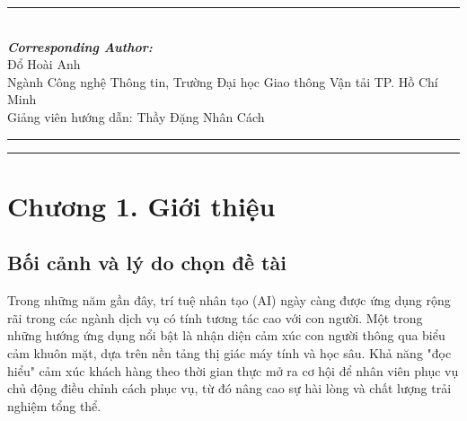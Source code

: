 \documentclass{iaesarticle}
\begin{document}
\parbox[t][][s]{0.65\textwidth}{%
\begin{abstract}
\vspace{.3em}
Trong bối cảnh chuyển đổi số, việc nắm bắt cảm xúc khách hàng theo thời gian thực đóng vai trò quan trọng trong việc nâng cao chất lượng dịch vụ tại các điểm tiếp xúc như quầy tiếp nhận hay khu vực phục vụ. Báo cáo trình bày quá trình xây dựng một hệ thống ứng dụng trí tuệ nhân tạo nhận diện biểu cảm khuôn mặt khách hàng qua camera, quy đổi thành bốn cấp độ hài lòng: rất hài lòng, hài lòng, bình thường và không hài lòng, theo từng chu kỳ quan sát 5 giây.

Hệ thống được xây dựng dưới dạng ứng dụng Web với bảng điều khiển (dashboard) trực quan, hỗ trợ hai nguồn camera (camera máy chủ và webcam trình duyệt), cho phép người dùng chủ động bật/tắt nhận diện, và linh hoạt chuyển đổi giữa mô hình trí tuệ nhân tạo có sẵn với mô hình do nhóm tự huấn luyện. Toàn bộ kết quả nhận diện được tự động lưu trữ lên Google Sheets hoặc tệp cục bộ, đồng thời hỗ trợ xuất báo cáo thống kê dưới dạng tệp Excel.

Kết quả thử nghiệm bước đầu cho thấy hệ thống hoạt động ổn định theo thời gian thực, cung cấp dữ liệu trực quan hỗ trợ nhân viên và quản lý theo dõi xu hướng hài lòng của khách hàng, đồng thời chỉ ra một số hạn chế và hướng phát triển tiếp theo của đề tài.
\end{abstract}
    }
\parbox[l]{\textwidth}{%
\rule{0.275\textwidth}{0.5pt} \hspace{0.5cm} \hrulefill
\\
\emph{\textbf{Corresponding Author:}}
\vspace{.5em}\\
Đổ Hoài Anh\\
Ngành Công nghệ Thông tin, Trường Đại học Giao thông Vận tải TP. Hồ Chí Minh\\
Giảng viên hướng dẫn: Thầy Đặng Nhân Cách
}
\vspace{.5em}
\hrule
\vspace{.1em}
\hrule

\section{Chương 1. Giới thiệu}
\label{sec:intro}

\subsection{Bối cảnh và lý do chọn đề tài}
Trong những năm gần đây, trí tuệ nhân tạo (AI) ngày càng được ứng dụng rộng rãi trong các ngành dịch vụ có tính tương tác cao với con người. Một trong những hướng ứng dụng nổi bật là nhận diện cảm xúc con người thông qua biểu cảm khuôn mặt, dựa trên nền tảng thị giác máy tính và học sâu. Khả năng "đọc hiểu" cảm xúc khách hàng theo thời gian thực mở ra cơ hội để nhân viên phục vụ chủ động điều chỉnh cách phục vụ, từ đó nâng cao sự hài lòng và chất lượng trải nghiệm tổng thể.
\end{document}
